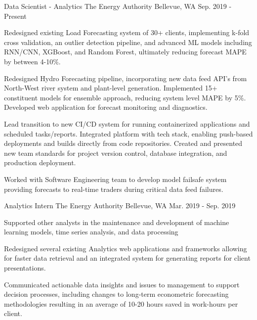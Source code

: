 

\begin{cventries}

  \cventry
    {Data Scientist - Analytics} %
    {The Energy Authority} %
    {Bellevue, WA} %
    {Sep. 2019 - Present} %
    {
      \begin{cvitems} %
        \item {Redesigned existing Load Forecasting system of 30+ clients, implementing k-fold cross validation, an outlier detection pipeline, and advanced ML models including RNN/CNN, XGBoost, and Random Forest, ultimately reducing forecast MAPE by between 4-10\%.}
        \item {Redesigned Hydro Forecasting pipeline, incorporating new data feed API's from North-West river system and plant-level generation. Implemented 15+ constituent models for ensemble approach, reducing system level MAPE by 5\%. Developed web application for forecast monitoring and diagnostics.}
        \item {Lead transition to new CI/CD system for running containerized applications and scheduled tasks/reports. Integrated platform with tech stack, enabling push-based deployments and builds directly from code repositories. Created and presented new team standards for project version control, database integration, and production deployment.}
        \item {Worked with Software Engineering team to develop model failsafe system providing forecasts to real-time traders during critical data feed failures.}
      \end{cvitems}
    }

  \cventry
    {Analytics Intern} %
    {The Energy Authority} %
    {Bellevue, WA} %
    {Mar. 2019 - Sep. 2019} %
    {
      \begin{cvitems} %
        \item {Supported other analysts in the maintenance and development of machine learning models, time series analysis, and data processing}
        \item {Redesigned several existing Analytics web applications and frameworks allowing for faster data retrieval and an integrated system for generating reports for client presentations.}
        \item {Communicated actionable data insights and issues to management to support decision processes, including changes to long-term econometric forecasting methodologies resulting in an average of 10-20 hours saved in work-hours per client.}
      \end{cvitems}
    }


\end{cventries}
